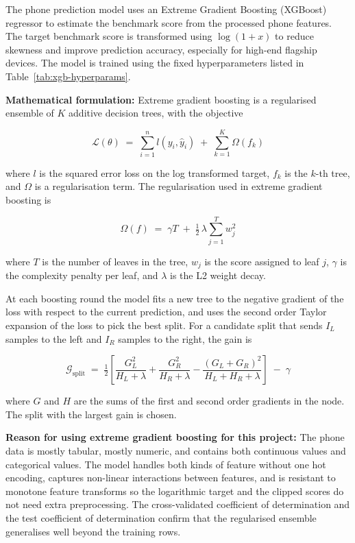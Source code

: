 \documentclass[12pt]{report}
\numberwithin{figure}{chapter}
\numberwithin{table}{chapter}
\numberwithin{equation}{chapter}
\begin{document}
The phone prediction model uses an Extreme Gradient Boosting (XGBoost) regressor to estimate the benchmark score from the processed phone features. The target benchmark score is transformed using $\log(1+x)$ to reduce skewness and improve prediction accuracy, especially for high-end flagship devices. The model is trained using the fixed hyperparameters listed in Table~\ref{tab:xgb-hyperparams}.

\textbf{Mathematical formulation:}
Extreme gradient boosting is a regularised ensemble of $K$ additive decision trees, with the objective

\begin{equation}
\mathcal{L}(\theta) \;=\; \sum_{i=1}^{n} l\!\left(y_i, \hat{y}_i\right) \;+\; \sum_{k=1}^{K} \Omega(f_k)
\label{eq:xgb-objective}
\end{equation}

\noindent where $l$ is the squared error loss on the log transformed target, $f_k$ is the $k$-th tree, and $\Omega$ is a regularisation term. The regularisation used in extreme gradient boosting is

\begin{equation}
\Omega(f) \;=\; \gamma T \;+\; \tfrac{1}{2}\, \lambda \sum_{j=1}^{T} w_j^{2}
\label{eq:xgb-regularisation}
\end{equation}

\noindent where $T$ is the number of leaves in the tree, $w_j$ is the score assigned to leaf $j$, $\gamma$ is the complexity penalty per leaf, and $\lambda$ is the L2 weight decay.

At each boosting round the model fits a new tree to the negative gradient of the loss with respect to the current prediction, and uses the second order Taylor expansion of the loss to pick the best split. For a candidate split that sends $I_L$ samples to the left and $I_R$ samples to the right, the gain is

\begin{equation}
\mathcal{G}_{\text{split}} \;=\; \tfrac{1}{2}\!\left[ \frac{G_L^{2}}{H_L + \lambda} + \frac{G_R^{2}}{H_R + \lambda} - \frac{(G_L + G_R)^{2}}{H_L + H_R + \lambda} \right] \;-\; \gamma
\label{eq:xgb-gain}
\end{equation}

\noindent where $G$ and $H$ are the sums of the first and second order gradients in the node. The split with the largest gain is chosen.

\textbf{Reason for using extreme gradient boosting for this project:} The phone data is mostly tabular, mostly numeric, and contains both continuous values and categorical values. The model handles both kinds of feature without one hot encoding, captures non-linear interactions between features, and is resistant to monotone feature transforms so the logarithmic target and the clipped scores do not need extra preprocessing. The cross-validated coefficient of determination and the test coefficient of determination confirm that the regularised ensemble generalises well beyond the training rows.
\end{document}
